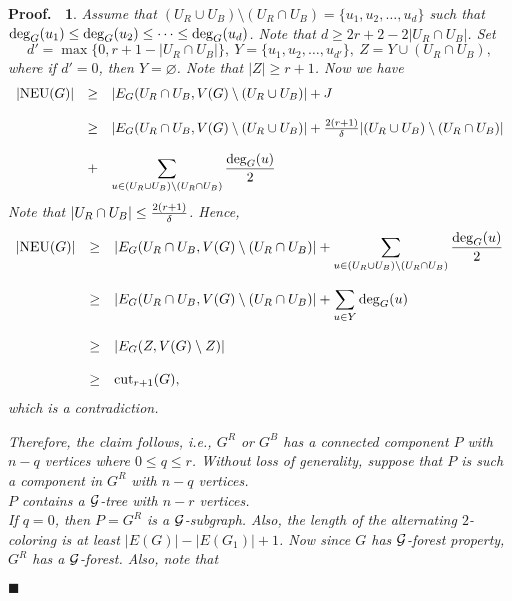 \documentclass[11pt]{article}
\newtheorem{preproof}{{\bf Proof.\ }}
\newenvironment{proof}[1]{\begin{preproof}{\rm
               #1}\hfill{$\blacksquare$}}{\end{preproof}}
\begin{document}
\begin{proof}
{%
Assume that $(U_R\cup U_B)\setminus (U_R\cap U_B)=\{u_1,u_2,\ldots,u_d\}$
such that ${\rm deg}_G(u_1)\leq {\rm deg}_G(u_2)\leq\cdots\leq{\rm deg}_G(u_d)$.
Note that $d\geq 2r+2-2|U_R\cap U_B|$. 
Set 
$$d'=\max\{0, r+1-|U_R\cap U_B|\},\ Y=\{u_1,u_2,\ldots,u_{d'}\},\  Z=Y\cup (U_R\cap U_B),$$
where if $d'=0$, then $Y=\varnothing$. Note that $|Z|\geq r+1$. 
Now we have
$$\begin{array}{lll}
|{\rm NEU}(G)| & \geq &  |E_G(U_R\cap U_B, V(G)\setminus (U_R\cup U_B)|+J\\
&&\\
& \geq &  |E_G(U_R\cap U_B, V(G)\setminus (U_R\cup U_B)|+{2(r+1)\over \delta}|(U_R\cup U_B)\setminus (U_R\cap U_B)|\\
&&\\
& +&  \displaystyle\sum_{u\in (U_R\cup U_B)\setminus (U_R\cap U_B)}{{\rm deg}_G(u)\over 2}
\end{array}$$
Note that $|U_R\cap U_B|\leq {2(r+1)\over \delta}$. Hence, 
$$\begin{array}{lll}
|{\rm NEU}(G)| & \geq & |E_G(U_R\cap U_B, V(G)\setminus(U_R\cap U_B)|+
\displaystyle\sum_{u\in (U_R\cup U_B)\setminus (U_R\cap U_B)}{{\rm deg}_G(u)\over 2}\\
&&\\
 & \geq &
|E_G(U_R\cap U_B, V(G)\setminus(U_R\cap U_B)|+
\displaystyle\sum_{u\in Y}{\rm deg}_G(u)\\
&&\\
& \geq &
|E_G(Z, V(G)\setminus Z)| \\
&&\\
& \geq  & {\rm cut}_{r+1}(G),  
\end{array}$$
which is a contradiction. 

Therefore, the claim follows, i.e., $G^R$ or $G^B$ 
has a connected component  $P$ with $n-q$ vertices where $0\leq q\leq r$.
Without loss of generality, suppose that $P$ is such a component in $G^R$ with $n-q$ vertices.\\

\noindent{\bf Step V (Claim):} $P$ contains a ${\cal G}$-tree with $n-r$ vertices.\\

If $q=0$, then $P=G^R$ is a ${\cal G}$-subgraph. Also, 
the length of the alternating $2$-coloring  is at least 
$|E(G)|-|E(G_1)|+1$. Now since $G$ has 
${\cal G}$-forest property, $G^R$ has a ${\cal G}$-forest. 
Also, note that 

}
\end{proof}
\end{document}
